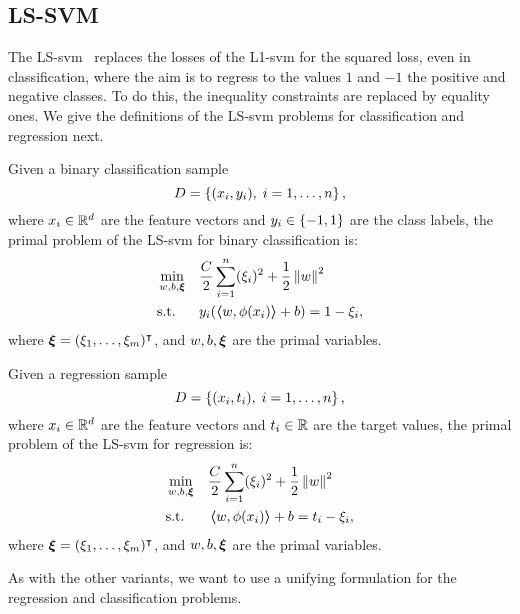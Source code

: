\subsection{LS-SVM}
%
The LS-\acrshort{svm}~\citep{SuykensV99} replaces the losses of the L1-\acrshort{svm} for the squared loss, even in classification, where the aim is to regress to the values $1$ and $-1$ the positive and negative classes.
To do this, the inequality constraints are replaced by equality ones.
%
We give the definitions of the LS-\acrshort{svm} problems for classification and regression next.
\begin{definition}
    Given a binary classification sample
    $$ D = \left\{(x_i, y_i), \; i=1, \ldots, n\right\} ,$$
    where $x_i \in \mathbb{R}^d$ are the feature vectors and $y_i \in \left\{-1, 1\right\}$ are the class labels, 
    the primal problem of the LS-\acrshort{svm} for binary classification is:
    \begin{equation}
        \label{eq:ls_primal_clas}
        \begin{aligned}
            &\min_{w, b, \fv{\xi}} & & \frac{C}{2} \sum_{i=1}^\nsamples (\xi_i)^2 + \frac{1}{2} \norm{w}^2 \\
            & \text{s.t.} & & y_i (\dotp{w}{\phi(x_i)} + b) = 1 - \xi_i , 
        \end{aligned}  
    \end{equation}
    where $\bm{\xi} = (\xi_1, \ldots, \xi_m)^\intercal$, and $w, b, \bm{\xi}$ are the primal variables.
\end{definition}
%
\begin{definition}
    Given a regression sample
    $$ D = \left\{(x_i, t_i), \; i=1, \ldots, n\right\} ,$$
    where $x_i \in \mathbb{R}^d$ are the feature vectors and $t_i \in \mathbb{R}$ are the target values, 
    the primal problem of the LS-\acrshort{svm} for regression is:
    \begin{equation}
        \label{eq:ls_primal_reg}
        \begin{aligned}
            &\min_{w, b, \fv{\xi}} & & \frac{C}{2} \sum_{i=1}^\nsamples (\xi_i)^2 + \frac{1}{2} \norm{w}^2 \\
            & \text{s.t.} & & \dotp{w}{\phi(x_i)} + b = t_i - \xi_i  , \\
        \end{aligned}  
    \end{equation}
    where $\bm{\xi} = (\xi_1, \ldots, \xi_m)^\intercal$, and $w, b, \bm{\xi}$ are the primal variables.
\end{definition}
%
As with the other variants, we want to use a unifying formulation for the regression and classification problems.

